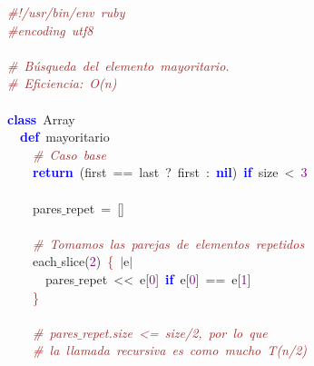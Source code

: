 \noindent
\mbox{}\textit{\textcolor{Brown}{\#!/usr/bin/env\ ruby}} \\
\mbox{}\textit{\textcolor{Brown}{\#encoding\ utf8}} \\
\mbox{} \\
\mbox{}\textit{\textcolor{Brown}{\#\ Búsqueda\ del\ elemento\ mayoritario.}} \\
\mbox{}\textit{\textcolor{Brown}{\#\ Eficiencia:\ O(n)}} \\
\mbox{} \\
\mbox{}\textbf{\textcolor{Blue}{class}}\ Array \\
\mbox{}\ \ \textbf{\textcolor{Blue}{def}}\ mayoritario \\
\mbox{}\ \ \ \ \textit{\textcolor{Brown}{\#\ Caso\ base}} \\
\mbox{}\ \ \ \ \textbf{\textcolor{Blue}{return}}\ \textcolor{BrickRed}{(}first\ \textcolor{BrickRed}{==}\ last\ \textcolor{BrickRed}{?}\ first\ \textcolor{BrickRed}{:}\ \textbf{\textcolor{Blue}{nil}}\textcolor{BrickRed}{)}\ \textbf{\textcolor{Blue}{if}}\ size\ \textcolor{BrickRed}{\textless{}}\ \textcolor{Purple}{3} \\
\mbox{}\ \ \ \  \\
\mbox{}\ \ \ \ pares$\_$repet\ \textcolor{BrickRed}{=}\ \textcolor{BrickRed}{[]} \\
\mbox{} \\
\mbox{}\ \ \ \ \textit{\textcolor{Brown}{\#\ Tomamos\ las\ parejas\ de\ elementos\ repetidos}} \\
\mbox{}\ \ \ \ each$\_$slice\textcolor{BrickRed}{(}\textcolor{Purple}{2}\textcolor{BrickRed}{)}\ \textcolor{Red}{\{}\ \textcolor{BrickRed}{$|$}e\textcolor{BrickRed}{$|$} \\
\mbox{}\ \ \ \ \ \ pares$\_$repet\ \textcolor{BrickRed}{\textless{}\textless{}}\ e\textcolor{BrickRed}{[}\textcolor{Purple}{0}\textcolor{BrickRed}{]}\ \textbf{\textcolor{Blue}{if}}\ e\textcolor{BrickRed}{[}\textcolor{Purple}{0}\textcolor{BrickRed}{]}\ \textcolor{BrickRed}{==}\ e\textcolor{BrickRed}{[}\textcolor{Purple}{1}\textcolor{BrickRed}{]} \\
\mbox{}\ \ \ \ \textcolor{Red}{\}} \\
\mbox{} \\
\mbox{}\ \ \ \ \textit{\textcolor{Brown}{\#\ pares$\_$repet.size\ \textless{}=\ size/2,\ por\ lo\ que}} \\
\mbox{}\ \ \ \ \textit{\textcolor{Brown}{\#\ la\ llamada\ recursiva\ es\ como\ mucho\ T(n/2)}} \\
